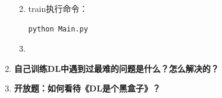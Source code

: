 \documentclass{article}
\begin{document}
\begin{CJK*}{UTF8}{gbsn}
\begin{enumerate}[label=(\roman*)]
\begin{enumerate}
\begin{table}[h]
\begin{tabular}{ccccccc}
	\end{tabular}
	\end{table}
	\item train执行命令：
		\begin{lstlisting}[]
			python Main.py
		\end{lstlisting}
	\item
\end{enumerate}


\item \textbf{自己训练DL中遇到过最难的问题是什么？怎么解决的？}
\item \textbf{开放题：如何看待《DL是个黑盒子》？}
\end{enumerate}

\end{CJK*}
 
\end{document}
